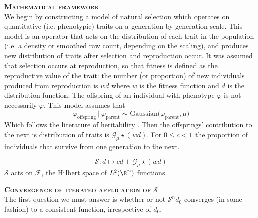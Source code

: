 \documentclass{article}
\begin{document}
\bigskip\noindent\textbf{\textsc{Mathematical framework}}\\
We begin by constructing a model of natural selection which operates on quantitative (i.e. phenotypic) traits on a generation-by-generation scale. This model is an operator that acts on the distribution of each trait in the population (i.e. a density or smoothed raw count, depending on the scaling), and produces new distribution of traits after selection and reproduction occur. It was assumed that selection occurs at reproduction, so that fitness is defined as the reproductive value of the trait: the number (or proportion) of new individuals produced from reproduction is $wd$ where $w$ is the fitness function and $d$ is the distribution function. The offspring of an individual with phenotype $\varphi$ is not necessarily $\varphi$. This model assumes that
$$\varphi_\textrm{offspring}\ \big|\ \varphi_\textrm{parent}\sim\textrm{Gaussian}\big(\varphi_\textrm{parent},\mu\big)$$
Which follows the literature of heritability \autocite{heritability follows normal}. Then the offsprings' contribution to the next is distribution of traits is $\mathcal G_\mu\star(wd)$. For $0\le c<1$ the proportion of individuals that survive from one generation to the next.

$$\mathcal S:d\mapsto cd+\mathcal G_\mu\star(wd)$$
$\mathcal S$ acts on $\mathcal F$, the Hilbert space of $L^2(\R^n)$ functions.

\bigskip\noindent\textbf{\textsc{Convergence of iterated application of $\mathcal S$}}\\
The first question we must answer is whether or not $\mathcal S^nd_0$ converges (in some fashion) to a consistent function, irrespective of $d_0$.
\end{document}
